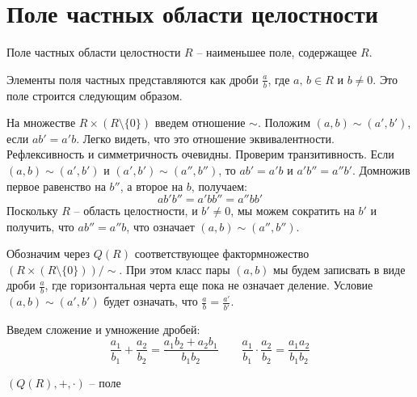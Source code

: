 \section{Поле частных области целостности}
\begin{conj}
    Поле частных области целостности $R$ -- наименьшее поле, содержащее $R$.
\end{conj}
Элементы поля частных представляются как дроби $\frac{a}{b}$, где $a, \, b \in R$ и $b \neq 0$.
Это поле строится следующим образом.

На множестве $R \times (R \setminus \{0\})$ введем отношение $\sim$. Положим $(a, b) \sim (a', b')$, если $ab' = a'b$. 
Легко видеть, что это отношение эквивалентности.
Рефлексивность и симметричность очевидны. Проверим транзитивность.
Если $(a, b) \sim (a', b')$ и $(a', b') \sim (a'', b'')$, то $ab' = a'b$ и $a'b'' = a''b'$. 
Домножив первое равенство на $b''$, а второе на $b$, получаем:
\[ ab'b'' = a'bb'' = a''bb' \]
Поскольку $R$ -- область целостности, и $b' \neq 0$, мы можем сократить на $b'$ и получить, что $ab'' = a''b$, что означает $(a, b) \sim (a'', b'')$.

Обозначим через $Q(R)$ соответствующее фактормножество $(R \times (R \setminus \{0\})) / \sim$.
При этом класс пары $(a, b)$ мы будем записвать в виде дроби $\frac{a}{b}$, где горизонтальная черта еще пока не означает деление.
Условие $(a, b) \sim (a', b')$ будет означать, что $\frac{a}{b} = \frac{a'}{b'}$.

Введем сложение и умножение дробей:
\[ \frac{a_1}{b_1} + \frac{a_2}{b_2} = \frac{a_1b_2 + a_2b_1}{b_1b_2} \quad\quad 
\frac{a_1}{b_1} \cdot \frac{a_2}{b_2} = \frac{a_1a_2}{b_1b_2} \]

\begin{theorem-non}
    $(Q(R), +, \cdot)$ -- поле
\end{theorem-non}

